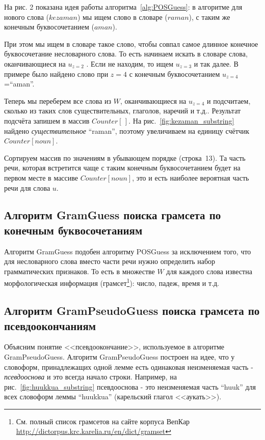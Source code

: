 
На рис. 2 показана идея работы алгоритма~\ref{alg:POSGuess}: в алгоритме для нового слова ($kezaman$) мы ищем слово в словаре ($raman$), с таким же конечным буквосочетанием ($aman$). 

При этом мы ищем в словаре такое слово, чтобы совпал самое длинное конечное буквосочетание несловарного слова. То есть начинаем искать в словаре слова, оканчивающиеся на $u_{z=2}$ . Если не находим, то ищем $u_{z=3}$ и так далее.
В примере было найдено слово при  $z=4$ с конечным буквосочетанием $u_{z=4}$=``aman''.

Теперь мы переберем все слова из $W$, оканчивающиеся на $u_{z=4}$ и подсчитаем, сколько из таких слов существительных, глаголов, наречий и т.д.. 
Результат подсчёта запишем в массив $Counter[\,]$. На рис.~\ref{fig:kezaman_substring} найдено \emph{существительное} ``raman'', поэтому увеличиваем на единицу счётчик $Counter[noun]$.

Сортируем массив по значениям в убывающем порядке (строка~13). Та часть речи, которая встретится чаще с таким конечным буквосочетанием будет на первом месте в массиве $Counter[noun]$, это и есть наиболее вероятная часть речи для слова $u$.


\subsection{Алгоритм GramGuess поиска грамсета по конечным буквосочетаниям}

Алгоритм GramGuess подобен алгоритму POSGuess за исключением того, что для несловарного слова вместо части речи нужно определить набор грамматических признаков.
То есть в множестве $W$ для каждого слова известна морфологическая информация (грамсет\footnote{См. полный список грамсетов на сайте корпуса ВепКар \url{http://dictorpus.krc.karelia.ru/en/dict/gramset}}): число, падеж, время и т.д.


\subsection{Алгоритм GramPseudoGuess поиска грамсета по псевдоокончаниям}

Объясним понятие <<псевдоокончание>>, используемое в алгоритме GramPseudoGuess.
Алгоритм GramPseudoGuess построен на идее, что у словоформ, принадлежащих одной лемме есть одинаковая неизменяемая часть - \emph{псевдооснова} и это всегда начало строки. Например, на рис.~\ref{fig:huukkua_substring} псевдооснова - это неизменяемая часть ``huuk'' для всех словоформ леммы ``huukkua'' (карельский глагол <<аукать>>).

